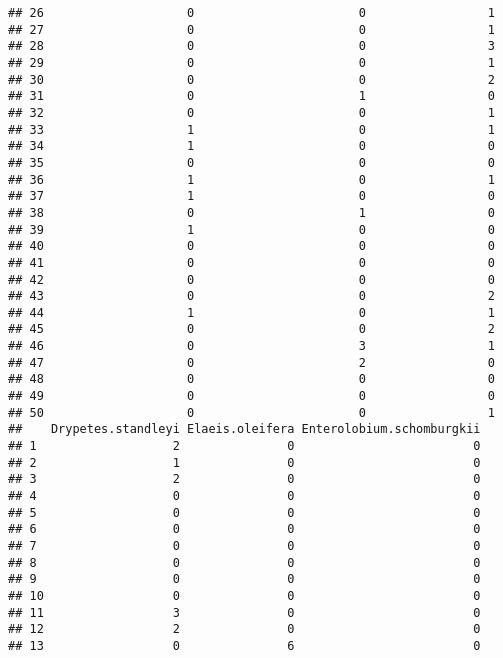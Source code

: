 \documentclass[
]{article}
\begin{document}
\begin{verbatim}
## 26                    0                       0                 1
## 27                    0                       0                 1
## 28                    0                       0                 3
## 29                    0                       0                 1
## 30                    0                       0                 2
## 31                    0                       1                 0
## 32                    0                       0                 1
## 33                    1                       0                 1
## 34                    1                       0                 0
## 35                    0                       0                 0
## 36                    1                       0                 1
## 37                    1                       0                 0
## 38                    0                       1                 0
## 39                    1                       0                 0
## 40                    0                       0                 0
## 41                    0                       0                 0
## 42                    0                       0                 0
## 43                    0                       0                 2
## 44                    1                       0                 1
## 45                    0                       0                 2
## 46                    0                       3                 1
## 47                    0                       2                 0
## 48                    0                       0                 0
## 49                    0                       0                 0
## 50                    0                       0                 1
##    Drypetes.standleyi Elaeis.oleifera Enterolobium.schomburgkii
## 1                   2               0                         0
## 2                   1               0                         0
## 3                   2               0                         0
## 4                   0               0                         0
## 5                   0               0                         0
## 6                   0               0                         0
## 7                   0               0                         0
## 8                   0               0                         0
## 9                   0               0                         0
## 10                  0               0                         0
## 11                  3               0                         0
## 12                  2               0                         0
## 13                  0               6                         0

\end{verbatim}
\end{document}
